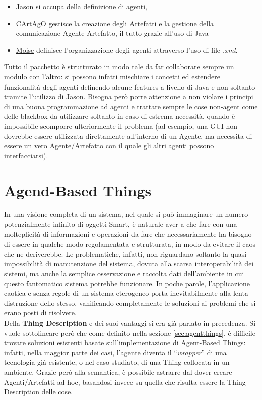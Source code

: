 \documentclass[12pt,a4paper,openright,oneside]{report}
\newcommand{\quotes}[1]{``#1''}
\begin{document}
\begin{itemize}
	\item \ul{Jason} si occupa della definizione di agenti,
	\item \ul{CArtAgO} gestisce la creazione degli Artefatti e la gestione della comunicazione Agente-Artefatto, il tutto grazie all'uso di Java
	\item \ul{Moise} definisce l'organizzazione degli agenti attraverso l'uso di file \textit{.xml}.
\end{itemize}

Tutto il pacchetto è strutturato in modo tale da far collaborare sempre un modulo con l'altro: si possono infatti mischiare i concetti ed estendere funzionalità degli agenti definendo alcune features a livello di Java e non soltanto tramite l'utilizzo di Jason. Bisogna però porre attenzione a non violare i principi di una buona programmazione ad agenti e trattare sempre le cose non-agent come delle blackbox da utilizzare soltanto in caso di estrema necessità, quando è impossibile scomporre ulteriormente il problema (ad esempio, una GUI non dovrebbe essere utilizzata direttamente all'interno di un Agente, ma necessita di essere un vero Agente/Artefatto con il quale gli altri agenti possono interfacciarsi).\\



\section{Agend-Based Things}
In una visione completa di un sistema, nel quale si può immaginare un numero potenzialmente infinito di oggetti Smart, è naturale aver a che fare con una molteplicità di informazioni e operazioni da fare che necessariamente ha bisogno di essere in qualche modo regolamentata e strutturata, in modo da evitare il caos che ne deriverebbe. Le problematiche, infatti, non riguardano soltanto la quasi impossibilità di manutenzione del sistema, dovuta alla scarsa interoperabilità dei sistemi, ma anche la semplice osservazione e raccolta dati dell'ambiente in cui questo fantomatico sistema potrebbe funzionare. In poche parole, l'applicazione caotica e senza regole di un sistema eterogeneo porta inevitabilmente alla lenta distruzione dello stesso, vanificando completamente le soluzioni ai problemi che si erano posti di risolvere.\\

Della \textbf{Thing Description} e dei suoi vantaggi si era già parlato in precedenza. Si vuole sottolineare però che come definito nella sezione \ref{sec:agentthings}, è difficile trovare soluzioni esistenti basate sull'implementazione di Agent-Based Things: infatti, nella maggior parte dei casi, l'agente diventa il \quotes{\textit{wrapper}} di una tecnologia già esistente, o nel caso studiato, di una Thing collocata in un ambiente. Grazie però alla semantica, è possibile astrarre dal dover creare Agenti/Artefatti ad-hoc, basandosi invece su quella che risulta essere la Thing Description delle cose.\\
\end{document}
